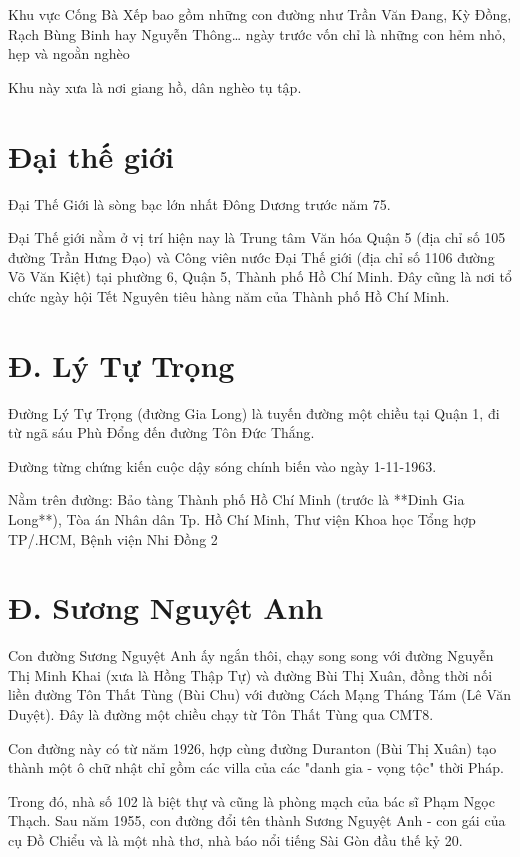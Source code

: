 Khu vực Cống Bà Xếp bao gồm những con đường như Trần Văn Đang, Kỳ Đồng, Rạch Bùng Binh hay Nguyễn Thông… ngày trước vốn chỉ là những con hẻm nhỏ, hẹp và ngoằn nghèo

Khu này xưa là nơi giang hồ, dân nghèo tụ tập.

\section{Đại thế giới}

Đại Thế Giới là sòng bạc lớn nhất Đông Dương trước năm 75.

Đại Thế giới nằm ở vị trí hiện nay là Trung tâm Văn hóa Quận 5 (địa chỉ số 105 đường Trần Hưng Đạo) và Công viên nước Đại Thế giới (địa chỉ số 1106 đường Võ Văn Kiệt) tại phường 6, Quận 5, Thành phố Hồ Chí Minh. Đây cũng là nơi tổ chức ngày hội Tết Nguyên tiêu hàng năm của Thành phố Hồ Chí Minh.

\section{Đ. Lý Tự Trọng}

Đường Lý Tự Trọng (đường Gia Long) là tuyến đường một chiều tại Quận 1, đi từ ngã sáu Phù Đổng đến đường Tôn Đức Thắng.

Đường từng chứng kiến cuộc dậy sóng chính biến vào ngày 1-11-1963.

Nằm trên đường: Bảo tàng Thành phố Hồ Chí Minh (trước là **Dinh Gia Long**), Tòa án Nhân dân Tp. Hồ Chí Minh, Thư viện Khoa học Tổng hợp TP/.HCM, Bệnh viện Nhi Đồng 2

\section{Đ. Sương Nguyệt Anh}

Con đường Sương Nguyệt Anh ấy ngắn thôi, chạy song song với đường Nguyễn Thị Minh Khai (xưa là Hồng Thập Tự) và đường Bùi Thị Xuân, đồng thời nối liền đường Tôn Thất Tùng (Bùi Chu) với đường Cách Mạng Tháng Tám (Lê Văn Duyệt). Đây là đường một chiều chạy từ Tôn Thất Tùng qua CMT8.

 Con đường này có từ năm 1926, hợp cùng đường Duranton (Bùi Thị Xuân) tạo thành một ô chữ nhật chỉ gồm các villa của các "danh gia - vọng tộc" thời Pháp.

Trong đó, nhà số 102 là biệt thự và cũng là phòng mạch của bác sĩ Phạm Ngọc Thạch. Sau năm 1955, con đường đổi tên thành Sương Nguyệt Anh - con gái của cụ Đồ Chiểu và là một nhà thơ, nhà báo nổi tiếng Sài Gòn đầu thế kỷ 20.

